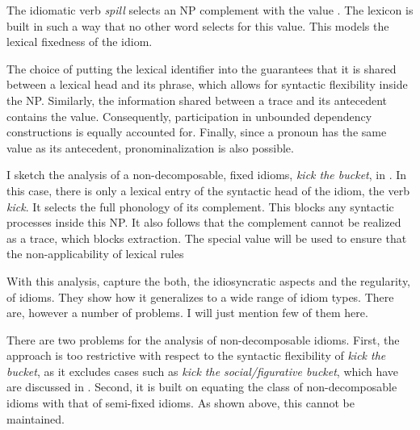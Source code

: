 \documentclass[output=paper]{langsci/langscibook}
\begin{document}
The idiomatic verb \emph{spill} selects an NP complement with the  value . 
The lexicon is built in such a way that no other word selects for this  value. 
This models the lexical fixedness of the idiom.

The choice of putting the lexical identifier into the  guarantees that it is shared between a lexical head and its phrase, which allows for syntactic flexibility inside the NP. 
Similarly, the information shared between a trace and its antecedent contains the  value. Consequently, participation in unbounded dependency constructions is equally accounted for.
Finally, since a pronoun has the same  value as its antecedent, pronominalization is also possible. 
%


I sketch the analysis of a non-decomposable, fixed idioms, \emph{kick the bucket}, in . 
In this case, there is only a lexical entry of the syntactic head of the idiom, the verb \emph{kick}. 
It selects the full phonology of its complement. This blocks any syntactic processes inside this NP. It also follows that the complement cannot be realized as a trace, which blocks extraction. The special  value  will be used to ensure that the non-applicability of lexical rules 


\ea %
\label{ke-kick}
\z 


With this analysis, \cite{KE94a} capture the both, the idiosyncratic aspects and the regularity, of idioms. 
They show how it generalizes to a wide range of idiom types. 
There are, however a number of problems. I will just mention few of them here.

There are two problems for the analysis of non-decomposable idioms. 
First, the approach is too restrictive with respect to the syntactic flexibility of \emph{kick the bucket}, as it excludes cases such as \emph{kick the social/figurative bucket}, which have are discussed in  \cite{Ernst:81}. 
Second, it is built on equating the class of non-decomposable idioms with that of semi-fixed idioms. As shown above, this cannot be maintained. 
\end{document}

